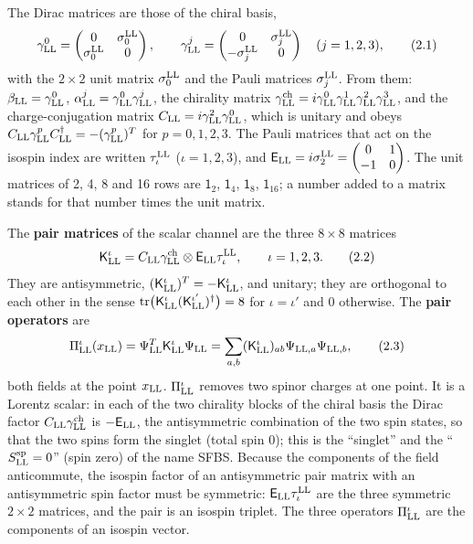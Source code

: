 \documentclass[
  10pt,
]{article}
\begin{document}
The Dirac matrices are those of the chiral basis,
\[\gamma^0_{\rm LL}=\begin{pmatrix}0&\sigma^{\rm LL}_0\\\sigma^{\rm LL}_0&0\end{pmatrix},\qquad
\gamma^j_{\rm LL}=\begin{pmatrix}0&\sigma^{\rm LL}_j\\-\sigma^{\rm LL}_j&0\end{pmatrix}\quad(j=1,2,3),\tag{2.1}\]
with the \(2\times2\) unit matrix \(\sigma^{\rm LL}_0\) and the Pauli
matrices \(\sigma^{\rm LL}_j\). From them:
\(\beta_{\rm LL}=\gamma^0_{\rm LL}\),
\(\alpha^j_{\rm LL}=\gamma^0_{\rm LL}\gamma^j_{\rm LL}\), the chirality
matrix
\(\gamma^{\rm ch}_{\rm LL}=i\gamma^0_{\rm LL}\gamma^1_{\rm LL}\gamma^2_{\rm LL}\gamma^3_{\rm LL}\),
and the charge-conjugation matrix
\(C_{\rm LL}=i\gamma^2_{\rm LL}\gamma^0_{\rm LL}\), which is unitary and
obeys
\(C_{\rm LL}\gamma^p_{\rm LL}C_{\rm LL}^\dagger=-(\gamma^p_{\rm LL})^T\)
for \(p=0,1,2,3\). The Pauli matrices that act on the isospin index are
written \(\tau^{\rm LL}_\iota\) (\(\iota=1,2,3\)), and
\(\mathsf E_{\rm LL}=i\sigma^{\rm LL}_2=\begin{pmatrix}0&1\\-1&0\end{pmatrix}\).
The unit matrices of 2, 4, 8 and 16 rows are \(\mathsf 1_2\),
\(\mathsf 1_4\), \(\mathsf 1_8\), \(\mathsf 1_{16}\); a number added to
a matrix stands for that number times the unit matrix.

The \textbf{pair matrices} of the scalar channel are the three
\(8\times8\) matrices
\[\mathsf K^\iota_{\rm LL}=C_{\rm LL}\gamma^{\rm ch}_{\rm LL}\otimes\mathsf E_{\rm LL}\tau^{\rm LL}_\iota,\qquad\iota=1,2,3.\tag{2.2}\]
They are antisymmetric,
\((\mathsf K^\iota_{\rm LL})^T=-\mathsf K^\iota_{\rm LL}\), and unitary;
they are orthogonal to each other in the sense
\(\mathrm{tr}\big(\mathsf K^\iota_{\rm LL}(\mathsf K^{\iota'}_{\rm LL})^\dagger\big)=8\)
for \(\iota=\iota'\) and \(0\) otherwise. The \textbf{pair operators}
are
\[\Pi^\iota_{\rm LL}(x_{\rm LL})=\Psi^T_{\rm LL}\mathsf K^\iota_{\rm LL}\Psi_{\rm LL}
=\sum_{a,b}(\mathsf K^\iota_{\rm LL})_{ab}\Psi_{{\rm LL},a}\Psi_{{\rm LL},b},\tag{2.3}\]
both fields at the point \(x_{\rm LL}\). \(\Pi^\iota_{\rm LL}\) removes
two spinor charges at one point. It is a Lorentz scalar: in each of the
two chirality blocks of the chiral basis the Dirac factor
\(C_{\rm LL}\gamma^{\rm ch}_{\rm LL}\) is \(-\mathsf E_{\rm LL}\), the
antisymmetric combination of the two spin states, so that the two spins
form the singlet (total spin 0); this is the ``singlet'' and the
``\(S^{\rm sp}_{\rm LL}=0\)'' (spin zero) of the name SFBS. Because the
components of the field anticommute, the isospin factor of an
antisymmetric pair matrix with an antisymmetric spin factor must be
symmetric: \(\mathsf E_{\rm LL}\tau^{\rm LL}_\iota\) are the three
symmetric \(2\times2\) matrices, and the pair is an isospin triplet. The
three operators \(\Pi^\iota_{\rm LL}\) are the components of an isospin
vector.
\end{document}
